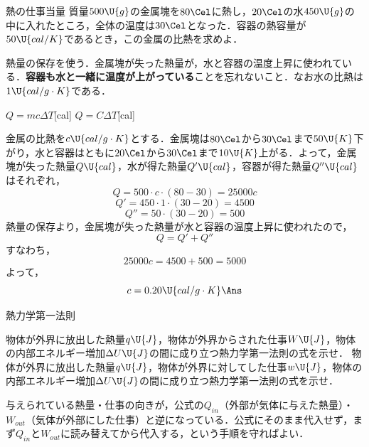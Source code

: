\begin{reidai}{熱の仕事当量}
\hspace{1zw}質量$500\U{g}$の金属塊を$80\Cel$に熱し，$20\Cel$の水$450\U{g}$の中に入れたところ，全体の温度は$30\Cel$となった．容器の熱容量が$50\U{cal/K}$であるとき，この金属の比熱を求めよ．
\end{reidai}

\begin{sisinE}
熱量の保存を使う．金属塊が失った熱量が，水と容器の温度上昇に使われている．{\bf 容器も水と一緒に温度が上がっている}ことを忘れないこと．なお水の比熱は$1\U{cal/g\cdot K}$である．
\end{sisinE}

\begin{key}
\hspace{3mm} $Q=mc\Delta T$\hspace{2mm}[cal]\hspace{10mm} $Q=C\Delta T$\hspace{2mm}[cal]
\end{key}

\begin{kaitou}
\hspace{1zw}金属の比熱を$c\U{cal/g\cdot K}$とする．金属塊は$80\Cel$から$30\Cel$まで$50\U{K}$下がり，水と容器はともに$20\Cel$から$30\Cel$まで$10\U{K}$上がる．よって，金属塊が失った熱量$Q\U{cal}$，水が得た熱量$Q'\U{cal}$，容器が得た熱量$Q''\U{cal}$はそれぞれ，
\[Q=500\cdot c\cdot(80-30)=25000c\]
\[Q'=450\cdot 1\cdot(30-20)=4500\]
\[Q''=50\cdot(30-20)=500\]
\hspace{1zw}熱量の保存より，金属塊が失った熱量が水と容器の温度上昇に使われたので，
\[Q=Q'+Q''\]
すなわち，
\[25000c=4500+500=5000\]
よって，
\[c=0.20\U{cal/g\cdot K}\Ans\]
\end{kaitou}

\begin{reidai}{熱力学第一法則}
\begin{komon}
 物体が外界に放出した熱量$q\U{J}$，物体が外界からされた仕事$W\U{J}$，物体の内部エネルギー増加$\Delta U\U{J}$の間に成り立つ熱力学第一法則の式を示せ．
 物体が外界に放出した熱量$q\U{J}$，物体が外界に対してした仕事$w\U{J}$，物体の内部エネルギー増加$\Delta U\U{J}$の間に成り立つ熱力学第一法則の式を示せ．
\end{komon}
\end{reidai}

\begin{sisinE}
与えられている熱量・仕事の向きが，公式の$Q_{in}$（外部が気体に与えた熱量）・$W_{out}$（気体が外部にした仕事）と逆になっている．公式にそのまま代入せず，まず$Q_{in}$と$W_{out}$に読み替えてから代入する，という手順を守ればよい．
\end{sisinE}

